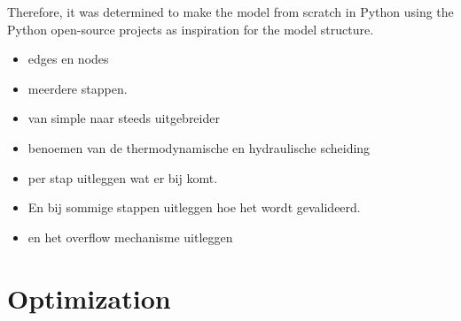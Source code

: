 Therefore, it was determined to make the model from scratch in Python using the Python open-source projects as inspiration for the model structure.




\begin{itemize}
\item edges en nodes
\item meerdere stappen.
\item van simple naar steeds uitgebreider
\item benoemen van de thermodynamische en hydraulische scheiding 
\item per stap uitleggen wat er bij komt.
\item En bij sommige stappen uitleggen hoe het wordt gevalideerd.
\item en het overflow mechanisme uitleggen
\end{itemize}


\section{Optimization}
